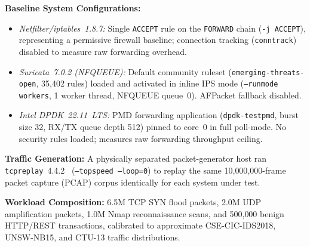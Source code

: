 \documentclass[journal]{IEEEtran}
\renewcommand{\_}{\textunderscore\allowbreak}
\begin{document}
\textbf{Baseline System Configurations:}
\begin{itemize}
  \item \textit{Netfilter/iptables~1.8.7:} Single \texttt{ACCEPT} rule on the \texttt{FORWARD} chain (\texttt{-j ACCEPT}), representing a permissive firewall baseline; connection tracking (\texttt{conntrack}) disabled to measure raw forwarding overhead.
  \item \textit{Suricata~7.0.2 (NFQUEUE):} Default community ruleset (\texttt{emerging-threats-open}, 35{,}402 rules) loaded and activated in inline IPS mode (\texttt{--runmode workers}, 1 worker thread, NFQUEUE queue~0). AFPacket fallback disabled.
  \item \textit{Intel DPDK~22.11~LTS:} PMD forwarding application (\texttt{dpdk-testpmd}, burst size 32, RX/TX queue depth 512) pinned to core~0 in full poll-mode. No security rules loaded; measures raw forwarding throughput ceiling.
\end{itemize}

\textbf{Traffic Generation:} A physically separated packet-generator host ran \texttt{tcpreplay}~4.4.2~\cite{tcpreplay2024} (\texttt{--topspeed --loop=0}) to replay the same 10{,}000{,}000-frame packet capture (PCAP) corpus identically for each system under test.

\textbf{Workload Composition:} 6.5M TCP SYN flood packets, 2.0M UDP
amplification packets, 1.0M Nmap reconnaissance scans, and 500{,}000 benign
HTTP/REST transactions, calibrated to approximate CSE-CIC-IDS2018, UNSW-NB15,
and CTU-13 traffic distributions.
\end{document}
